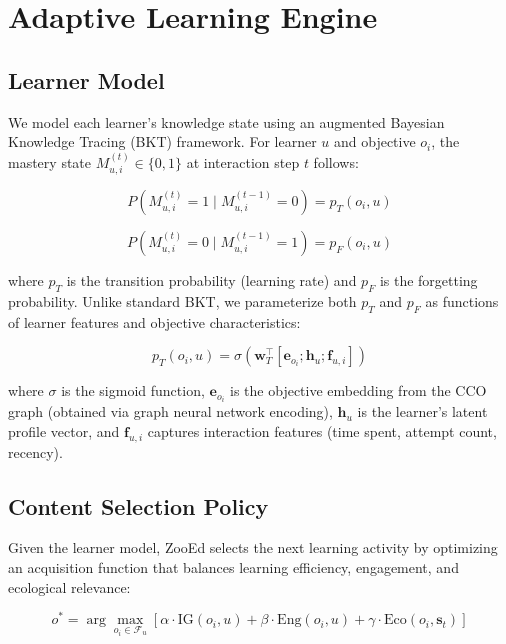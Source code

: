 \documentclass[11pt,a4paper]{article}
\begin{document}
\section{Adaptive Learning Engine}
\label{sec:adaptive}

\subsection{Learner Model}

We model each learner's knowledge state using an augmented Bayesian Knowledge Tracing (BKT) framework.
For learner $u$ and objective $o_i$, the mastery state $M_{u,i}^{(t)} \in \{0, 1\}$ at interaction step $t$ follows:

\begin{equation}
    P(M_{u,i}^{(t)} = 1 \mid M_{u,i}^{(t-1)} = 0) = p_T(o_i, u)
\end{equation}

\begin{equation}
    P(M_{u,i}^{(t)} = 0 \mid M_{u,i}^{(t-1)} = 1) = p_F(o_i, u)
\end{equation}

\noindent where $p_T$ is the transition probability (learning rate) and $p_F$ is the forgetting probability.
Unlike standard BKT, we parameterize both $p_T$ and $p_F$ as functions of learner features and objective characteristics:

\begin{equation}
    p_T(o_i, u) = \sigma\left(\mathbf{w}_T^\top [\mathbf{e}_{o_i}; \mathbf{h}_u; \mathbf{f}_{u,i}]\right)
\end{equation}

\noindent where $\sigma$ is the sigmoid function, $\mathbf{e}_{o_i}$ is the objective embedding from the CCO graph (obtained via graph neural network encoding), $\mathbf{h}_u$ is the learner's latent profile vector, and $\mathbf{f}_{u,i}$ captures interaction features (time spent, attempt count, recency).

\subsection{Content Selection Policy}

Given the learner model, ZooEd selects the next learning activity by optimizing an acquisition function that balances learning efficiency, engagement, and ecological relevance:

\begin{equation}
    o^* = \arg\max_{o_i \in \mathcal{F}_u} \left[\alpha \cdot \text{IG}(o_i, u) + \beta \cdot \text{Eng}(o_i, u) + \gamma \cdot \text{Eco}(o_i, \mathbf{s}_t)\right]
\end{equation}
\end{document}
